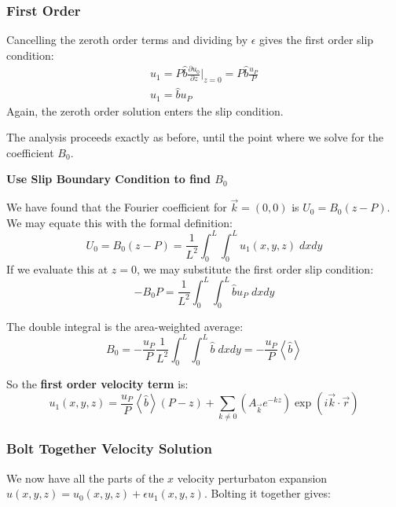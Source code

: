 \documentclass[12pt, a4paper, twoside, openright]{book}
\begin{document}
\subsubsection*{First Order}
Cancelling the zeroth order terms and dividing by $\epsilon$ gives the first order slip condition:
\begin{gather}
u_1 = P \hat{b} \frac{\partial u_0}{\partial z} \rvert_{z=0}
= P \hat{b} \frac{u_P}{P} \\
 u_1 = \hat{b} u_P
\end{gather}
Again, the zeroth order solution enters the slip condition.

\vspace{1em}
The analysis proceeds exactly as before, until the point where we solve for the coefficient $B_0$.
\vspace{1em}

\textbf{Use Slip Boundary Condition to find $B_0$}

We have found that the Fourier coefficient for $\vec{k} = (0,0)$ is $U_0 = B_0 (z - P)$.
We may equate this with the formal definition:
\begin{equation}
U_0 = B_0 (z - P) = \frac{1}{L^2} \int_0^L \int_0^L u_1(x,y,z) \;dxdy
\end{equation}
If we evaluate this at $z=0$, we may substitute the first order slip condition:
\begin{equation}
- B_0 P = \frac{1}{L^2} \int_0^L \int_0^L \hat{b} u_P \;dxdy
\end{equation}

The double integral is the area-weighted average:
\begin{equation}
B_0 = - \frac{u_P}{P} \frac{1}{L^2} \int_0^L \int_0^L \hat{b} \;dxdy
= - \frac{u_P }{P} \left< \hat{b} \right>
\end{equation}

\vspace{1em}
So the \textbf{first order velocity term} is:
\begin{equation}
u_1(x,y,z) =  \frac{u_P}{P} \left< \hat{b} \right> (P - z)
 + \sum_{k \neq 0} 
\left(  A_{\vec{k}} e^{-kz} \right)
\exp(i \vec{k}\cdot \vec{r})
\end{equation}

\subsubsection*{Bolt Together Velocity Solution}
We now have all the parts of the $x$ velocity perturbaton expansion $u(x,y,z) = u_0(x,y,z) + \epsilon u_1(x,y,z)$.  Bolting it together gives:
\end{document}
